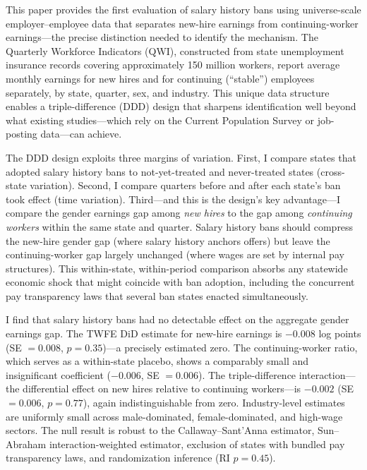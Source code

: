 \documentclass[12pt]{article}
\begin{document}
This paper provides the first evaluation of salary history bans using universe-scale employer--employee data that separates new-hire earnings from continuing-worker earnings---the precise distinction needed to identify the mechanism. The Quarterly Workforce Indicators (QWI), constructed from state unemployment insurance records covering approximately 150 million workers, report average monthly earnings for new hires and for continuing (``stable'') employees separately, by state, quarter, sex, and industry. This unique data structure enables a triple-difference (DDD) design that sharpens identification well beyond what existing studies---which rely on the Current Population Survey or job-posting data---can achieve.

The DDD design exploits three margins of variation. First, I compare states that adopted salary history bans to not-yet-treated and never-treated states (cross-state variation). Second, I compare quarters before and after each state's ban took effect (time variation). Third---and this is the design's key advantage---I compare the gender earnings gap among \textit{new hires} to the gap among \textit{continuing workers} within the same state and quarter. Salary history bans should compress the new-hire gender gap (where salary history anchors offers) but leave the continuing-worker gap largely unchanged (where wages are set by internal pay structures). This within-state, within-period comparison absorbs any statewide economic shock that might coincide with ban adoption, including the concurrent pay transparency laws that several ban states enacted simultaneously.

I find that salary history bans had no detectable effect on the aggregate gender earnings gap. The TWFE DiD estimate for new-hire earnings is $-0.008$ log points (SE $= 0.008$, $p = 0.35$)---a precisely estimated zero. The continuing-worker ratio, which serves as a within-state placebo, shows a comparably small and insignificant coefficient ($-0.006$, SE $= 0.006$). The triple-difference interaction---the differential effect on new hires relative to continuing workers---is $-0.002$ (SE $= 0.006$, $p = 0.77$), again indistinguishable from zero. Industry-level estimates are uniformly small across male-dominated, female-dominated, and high-wage sectors. The null result is robust to the Callaway--Sant'Anna estimator, Sun--Abraham interaction-weighted estimator, exclusion of states with bundled pay transparency laws, and randomization inference (RI $p = 0.45$).
\end{document}
